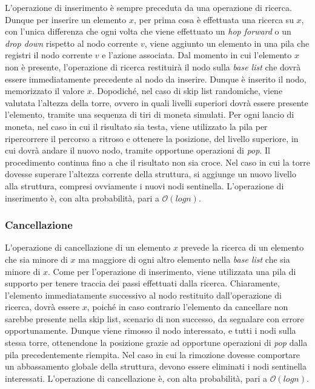 			L'operazione di inserimento è sempre preceduta da una operazione di ricerca. Dunque per inserire un elemento $ x $, per prima cosa è effettuata una ricerca su $ x $, con l'unica differenza che ogni volta che viene effettuato un \textit{hop forward} o un \textit{drop down} rispetto al nodo corrente $ v $, viene aggiunto un elemento in una pila che registri il nodo corrente $ v $ e l'azione associata.
			Dal momento in cui l'elemento $ x $ non è presente, l'operazione di ricerca restituirà il nodo sulla \textit{base list} che dovrà essere immediatamente precedente al nodo da inserire. Dunque è inserito il nodo, memorizzato il valore $ x $. Dopodiché, nel caso di skip list randomiche, viene valutata l'altezza della torre, ovvero in quali livelli superiori dovrà essere presente l'elemento, tramite una sequenza di tiri di moneta simulati. Per ogni lancio di moneta, nel caso in cui il risultato sia testa, viene utilizzato la pila per ripercorrere il percorso a ritroso e ottenere la posizione, del livello superiore, in cui dovrà andare il nuovo nodo, tramite opportune operazioni di \textit{pop}. Il procedimento continua fino a che il risultato non sia croce. Nel caso in cui la torre dovesse superare l'altezza corrente della struttura, si aggiunge un nuovo livello alla struttura, compresi ovviamente i nuovi nodi sentinella.
			L'operazione di inserimento è, con alta probabilità, pari a $\mathcal{O}(log{}n)$.
		
		\subsubsection{Cancellazione}
		
			L'operazione di cancellazione di un elemento $ x $ prevede la ricerca di un elemento che sia minore di $ x $ ma maggiore di ogni altro elemento nella \textit{base list} che sia minore di $ x $. Come per l'operazione di inserimento, viene utilizzata una pila di supporto per tenere traccia dei passi effettuati dalla ricerca. Chiaramente, l'elemento immediatamente successivo al nodo restituito dall'operazione di ricerca, dovrà essere $ x $, poiché in caso contrario l'elemento da cancellare non sarebbe presente nella skip list, scenario di non successo, da segnalare con errore opportunamente.
			Dunque viene rimosso il nodo interessato, e tutti i nodi sulla stessa torre, ottenendone la posizione grazie ad opportune operazioni di \textit{pop} dalla pila precedentemente riempita.
			Nel caso in cui la rimozione dovesse comportare un abbassamento globale della struttura, devono essere eliminati i nodi sentinella interessati.
			L'operazione di cancellazione è, con alta probabilità, pari a $\mathcal{O}(log{}n)$.
			
